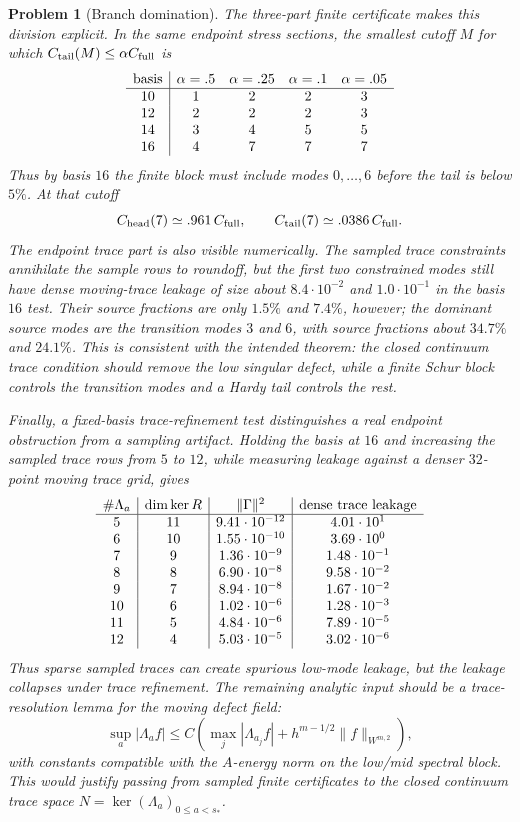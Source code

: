 \documentclass[11pt]{article}
\newtheorem{problem}[theorem]{Problem}
\begin{document}
\begin{problem}[Branch domination]
The three-part finite certificate makes this division explicit.  In the same
endpoint stress sections, the smallest cutoff \(M\) for which
\(C_{\rm tail}(M)\le \alpha C_{\rm full}\) is
\[
\begin{array}{c|cccc}
{\rm basis} & \alpha=.5 & \alpha=.25 & \alpha=.1 & \alpha=.05\\
\hline
10 & 1 & 2 & 2 & 3\\
12 & 2 & 2 & 2 & 3\\
14 & 3 & 4 & 5 & 5\\
16 & 4 & 7 & 7 & 7
\end{array}
\]
Thus by basis \(16\) the finite block must include modes \(0,\ldots,6\)
before the tail is below \(5\%\).  At that cutoff
\[
  C_{\rm head}(7)\simeq .961\,C_{\rm full},\qquad
  C_{\rm tail}(7)\simeq .0386\,C_{\rm full}.
\]
The endpoint trace part is also visible numerically.  The sampled trace
constraints annihilate the sample rows to roundoff, but the first two
constrained modes still have dense moving-trace leakage of size about
\(8.4\cdot10^{-2}\) and \(1.0\cdot10^{-1}\) in the basis \(16\) test.  Their
source fractions are only \(1.5\%\) and \(7.4\%\), however; the dominant source
modes are the transition modes \(3\) and \(6\), with source fractions about
\(34.7\%\) and \(24.1\%\).  This is consistent with the intended theorem:
the closed continuum trace condition should remove the low singular defect,
while a finite Schur block controls the transition modes and a Hardy tail
controls the rest.

Finally, a fixed-basis trace-refinement test distinguishes a real endpoint
obstruction from a sampling artifact.  Holding the basis at \(16\) and
increasing the sampled trace rows from \(5\) to \(12\), while measuring leakage
against a denser \(32\)-point moving trace grid, gives
\[
\begin{array}{c|c|c|c}
\#\Lambda_a & \dim\ker R & \|\Gamma\|^2 & {\rm dense\ trace\ leakage}\\
\hline
5  & 11 & 9.41\cdot10^{-12} & 4.01\cdot10^{1}\\
6  & 10 & 1.55\cdot10^{-10} & 3.69\cdot10^{0}\\
7  &  9 & 1.36\cdot10^{-9}  & 1.48\cdot10^{-1}\\
8  &  8 & 6.90\cdot10^{-8}  & 9.58\cdot10^{-2}\\
9  &  7 & 8.94\cdot10^{-8}  & 1.67\cdot10^{-2}\\
10 &  6 & 1.02\cdot10^{-6}  & 1.28\cdot10^{-3}\\
11 &  5 & 4.84\cdot10^{-6}  & 7.89\cdot10^{-5}\\
12 &  4 & 5.03\cdot10^{-5}  & 3.02\cdot10^{-6}
\end{array}
\]
Thus sparse sampled traces can create spurious low-mode leakage, but the
leakage collapses under trace refinement.  The remaining analytic input should
be a trace-resolution lemma for the moving defect field:
\[
  \sup_a |\Lambda_a f|
  \le C\left(\max_j|\Lambda_{a_j}f|+h^{m-1/2}\|f\|_{W^{m,2}}\right),
\]
with constants compatible with the \(A\)-energy norm on the low/mid spectral
block.  This would justify passing from sampled finite certificates to the
closed continuum trace space \(N=\ker(\Lambda_a)_{0\le a<s_*}\).


\end{problem}
\end{document}
